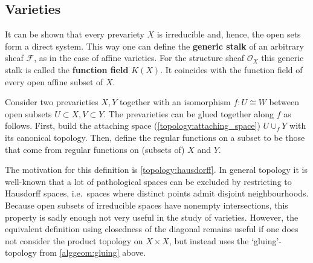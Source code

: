 
\subsection{Varieties}


    \begin{remark}
        It can be shown that every prevariety $X$ is irreducible and, hence, the open sets form a direct system. This way one can define the \textbf{generic stalk} of an arbitrary sheaf $\mathcal{F}$, as in the case of affine varieties. For the structure sheaf $\mathcal{O}_X$ this generic stalk is called the \textbf{function field} $K(X)$. It coincides with the function field of every open affine subset of $X$.
    \end{remark}

    \begin{construct}[Gluing]\label{alggeom:gluing}
        Consider two prevarieties $X,Y$ together with an isomorphism $f:U\cong W$ between open subsets $U\subset X,V\subset Y$. The prevarieties can be glued together along $f$ as follows. First, build the attaching space (\cref{topology:attaching_space}) $U\cup_fY$ with its canonical topology. Then, define the regular functions on a subset to be those that come from regular functions on (subsets of) $X$ and $Y$.
    \end{construct}

    \begin{remark}
        The motivation for this definition is \cref{topology:hausdorff}. In general topology it is well-known that a lot of pathological spaces can be excluded by restricting to Hausdorff spaces, i.e.~spaces where distinct points admit disjoint neighbourhoods. Because open subsets of irreducible spaces have nonempty intersections, this property is sadly enough not very useful in the study of varieties. However, the equivalent definition using closedness of the diagonal remains useful if one does not consider the product topology on $X\times X$, but instead uses the `gluing'-topology from \cref{alggeom:gluing} above.
    \end{remark}

